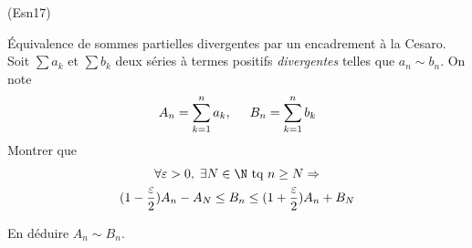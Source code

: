 \begin{tiny}(Esn17)\end{tiny} \label{Esn17} \'Equivalence de sommes partielles divergentes par un encadrement \og à la Cesaro\fg.\newline
Soit $\sum a_k$ et $\sum b_k$ deux séries à termes positifs \emph{divergentes} telles que $a_n \sim b_n$. On note
\begin{displaymath}
  A_n = \sum_{k=1}^n a_k,\hspace{0.5cm} B_n = \sum_{k=1}^n b_k
\end{displaymath}
Montrer que 
\begin{multline*}
\forall \varepsilon >0, \; \exists N \in \N \text{ tq } n\geq N \Rightarrow \\ 
  (1-\frac{\varepsilon}{2})A_n -A_N \leq B_n \leq (1+\frac{\varepsilon}{2})A_n + B_N
\end{multline*}

En déduire $A_n \sim B_n$.
